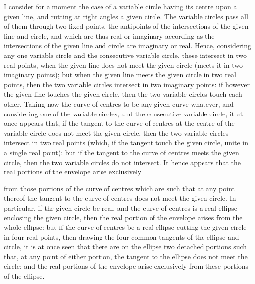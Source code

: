\documentclass[11pt,a4paper]{article}
\begin{document}
\smallskip
I consider for a moment the case of a variable circle having its centre upon a given line, and cutting at right angles a given circle. The variable circles pass all of them through two fixed points, the antipoints of the intersections of the given line and circle, and which are thus real or imaginary according as the intersections of the given line and circle are imaginary or real. Hence, considering any one variable circle and the consecutive variable circle, these intersect in two real points, when the given line does not meet the given circle (meets it in two imaginary points); but when the given line meets the given circle in two real points, then the two variable circles intersect in two imaginary points: if however the given line touches the given circle, then the two variable circles touch each other. Taking now the curve of centres to be any given curve whatever, and considering one of the variable circles, and the consecutive variable circle, it at once appears that, if the tangent to the curve of centres at the centre of the variable circle does not meet the given circle, then the two variable circles intersect in two real points (which, if the tangent touch the given circle, unite in a single real point): but if the tangent to the curve of centres meets the given circle, then the two variable circles do not intersect. It hence appears that the real portions of the envelope arise exclusively

\newpage

from those portions of the curve of centres which are such that at any point thereof the tangent to the curve of centres does not meet the given circle. In particular, if the given circle be real, and the curve of centres is a real ellipse enclosing the given circle, then the real portion of the envelope arises from the whole ellipse: but if the curve of centres be a real ellipse cutting the given circle in four real points, then drawing the four common tangents of the ellipse and circle, it is at once seen that there are on the ellipse two detached portions such that, at any point of either portion, the tangent to the ellipse does not meet the circle: and the real portions of the envelope arise exclusively from these portions of the ellipse.
\end{document}
